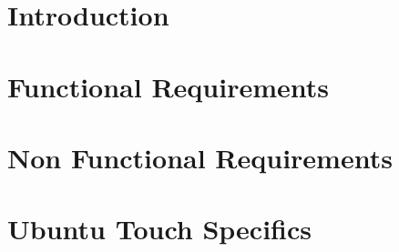 



\chapter{Introduction}












\chapter{Functional Requirements}










\newpage


\chapter{Non Functional Requirements}





\chapter{Ubuntu Touch Specifics}








%



